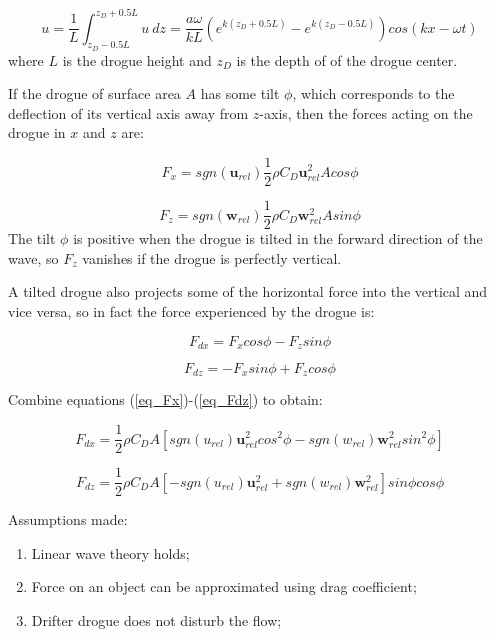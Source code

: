 \documentclass[12pt,letterpaper]{article}
\begin{document}
\begin{equation}
u = \dfrac{1}{L} \int_{z_D-0.5L}^{z_D+0.5L} u\ dz
= \dfrac{a \omega}{kL} \left( e^{k(z_D+0.5L)} - e^{k(z_D-0.5L)} \right)
cos{(kx-\omega t)}
\end{equation}
where $L$ is the drogue height and $z_D$ is the depth of of the drogue center.

If the drogue of surface area $A$ has some tilt $\phi$, which corresponds
to the deflection of its vertical axis away from $z$-axis, then the 
forces acting on the drogue in $x$ and $z$ are:

\begin{equation}
F_x = sgn(\mathbf{u}_{rel}) \dfrac{1}{2} \rho C_D \mathbf{u}_{rel}^2 A cos{\phi}
\label{eq_Fx}
\end{equation}

\begin{equation}
F_z = sgn(\mathbf{w}_{rel}) \dfrac{1}{2} \rho C_D \mathbf{w}_{rel}^2 A sin{\phi}
\label{eq_Fz}
\end{equation}
The tilt $\phi$ is positive when the drogue is tilted in the forward direction
of the wave, so $F_z$ vanishes if the drogue is perfectly vertical. 

A tilted drogue also projects some of the horizontal force into the vertical
and vice versa, so in fact the force experienced by the drogue is:

\begin{equation}
F_{dx} = F_x cos{\phi} -  F_z sin{\phi}
\label{eq_Fdx}
\end{equation}

\begin{equation}
F_{dz} = -F_x sin{\phi} + F_z cos{\phi}
\label{eq_Fdz}
\end{equation}

Combine equations (\ref{eq_Fx})-(\ref{eq_Fdz}) to obtain:

\begin{equation}
F_{dx} = \dfrac{1}{2} \rho C_D A 
\left[
 sgn(u_{rel}) \mathbf{u}_{rel}^2 cos^2{\phi} 
-sgn(w_{rel}) \mathbf{w}_{rel}^2 sin^2{\phi}
\right]
\end{equation}

\begin{equation}
F_{dz} = \dfrac{1}{2} \rho C_D A 
\left[
-sgn(u_{rel}) \mathbf{u}_{rel}^2 
+sgn(w_{rel}) \mathbf{w}_{rel}^2
\right]
sin{\phi} cos{\phi}
\end{equation}

Assumptions made:

\begin{enumerate}

\item Linear wave theory holds;

\item Force on an object can be approximated using drag coefficient;

\item Drifter drogue does not disturb the flow;

\end{enumerate}
\end{document}
